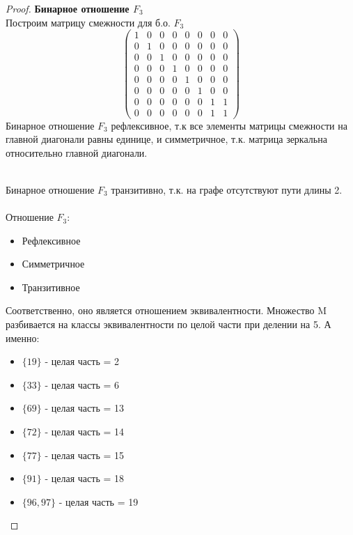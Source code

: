 \pagebreak
\begin{proof} \textbf{Бинарное отношение $F_3$}\\
Построим матрицу смежности для б.о. $F_3$
$$ \left( \begin{array}{cccccccc}
		   1 &0 &0 &0 &0 &0 &0 &0 
        \\0 &1 &0 &0 &0 &0 &0 &0
        \\0 &0 &1 &0 &0 &0 &0 &0
        \\0 &0 &0 &1 &0 &0 &0 &0
        \\0 &0 &0 &0 &1 &0 &0 &0
        \\0 &0 &0 &0 &0 &1 &0 &0
        \\0 &0 &0 &0 &0 &0 &1 &1
        \\0 &0 &0 &0 &0 &0 &1 &1 \end{array} \right) $$
Бинарное отношение $F_3$ рефлексивное, т.к все элементы матрицы смежности на главной диагонали равны единице, и симметричное, т.к. матрица зеркальна относительно главной диагонали.

\\
Бинарное отношение $F_3$ транзитивно, т.к. на графе отсутствуют пути длины 2.
\\ \\
Отношение $F_3$:
\begin{itemize}
    \item Рефлексивное
    \item Симметричное
    \item Транзитивное
\end{itemize}
Соответственно, оно является отношением эквивалентности.
Множество M разбивается на классы эквивалентности по целой части при делении на 5. А именно:
\begin{itemize}
    \item $\{19\}$ - целая часть = 2
    \item $\{33\}$ - целая часть = 6
    \item $\{69\}$ - целая часть = 13
    \item $\{72\}$ - целая часть = 14
    \item $\{77\}$ - целая часть = 15
    \item $\{91\}$ - целая часть = 18
    \item $\{96, 97\}$ - целая часть = 19
\end{itemize}
\end{proof}

